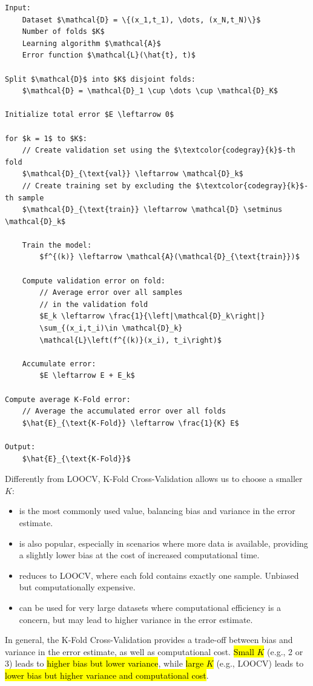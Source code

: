 \begin{lstlisting}[language=pseudo-code,mathescape=true,style={pseudocode-style},caption={K-Fold Cross-Validation Algorithm}]
Input:
    Dataset $\mathcal{D} = \{(x_1,t_1), \dots, (x_N,t_N)\}$
    Number of folds $K$
    Learning algorithm $\mathcal{A}$
    Error function $\mathcal{L}(\hat{t}, t)$

Split $\mathcal{D}$ into $K$ disjoint folds:
    $\mathcal{D} = \mathcal{D}_1 \cup \dots \cup \mathcal{D}_K$

Initialize total error $E \leftarrow 0$

for $k = 1$ to $K$:
    // Create validation set using the $\textcolor{codegray}{k}$-th fold
    $\mathcal{D}_{\text{val}} \leftarrow \mathcal{D}_k$
    // Create training set by excluding the $\textcolor{codegray}{k}$-th sample
    $\mathcal{D}_{\text{train}} \leftarrow \mathcal{D} \setminus \mathcal{D}_k$

    Train the model:
        $f^{(k)} \leftarrow \mathcal{A}(\mathcal{D}_{\text{train}})$

    Compute validation error on fold:
        // Average error over all samples
        // in the validation fold
        $E_k \leftarrow \frac{1}{\left|\mathcal{D}_k\right|}
        \sum_{(x_i,t_i)\in \mathcal{D}_k}
        \mathcal{L}\left(f^{(k)}(x_i), t_i\right)$

    Accumulate error:
        $E \leftarrow E + E_k$

Compute average K-Fold error:
    // Average the accumulated error over all folds
    $\hat{E}_{\text{K-Fold}} \leftarrow \frac{1}{K} E$

Output:
    $\hat{E}_{\text{K-Fold}}$
\end{lstlisting}
Differently from LOOCV, K-Fold Cross-Validation allows us to choose a smaller $K$:
\begin{itemize}
    \item {} is the most commonly used value, balancing bias and variance in the error estimate.
    \item {} is also popular, especially in scenarios where more data is available, providing a slightly lower bias at the cost of increased computational time.
    \item {} reduces to LOOCV, where each fold contains exactly one sample. Unbiased but computationally expensive.
    \item {} can be used for very large datasets where computational efficiency is a concern, but may lead to higher variance in the error estimate.
\end{itemize}
In general, the K-Fold Cross-Validation provides a trade-off between bias and variance in the error estimate, as well as computational cost. \hl{Small $K$} (e.g., 2 or 3) leads to \hl{higher bias but lower variance}, while \hl{large $K$} (e.g., LOOCV) leads to \hl{lower bias but higher variance and computational cost}.

